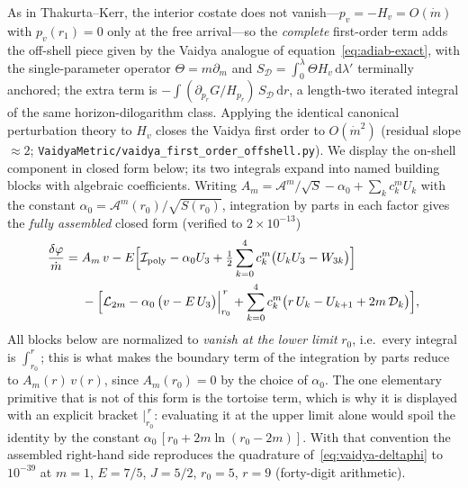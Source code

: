 \documentclass[12pt]{iopart}
\newcommand{\dd}{\mathrm{d}}
\theoremstyle{plain}
\theoremstyle{definition}
\theoremstyle{plain}
\theoremstyle{remark}
\begin{document}
As in Thakurta--Kerr, the interior costate does not
vanish---$p_v=-H_v=O(\dot m)$ with $p_v(r_1)=0$ only at the free arrival---so the
\emph{complete} first-order term adds the off-shell piece given by the Vaidya analogue
of equation~\eqref{eq:adiab-exact}, with the single-parameter operator $\Theta=m\partial_m$
and $S_{\mathcal D}=\int_0^\lambda\Theta H_v\,\dd\lambda'$ terminally anchored; the extra term is
$-\!\int(\partial_{p_r}G/H_{p_r})\,S_{\mathcal D}\,\dd r$, a length-two iterated integral of the
same horizon-dilogarithm class. Applying the identical canonical perturbation theory
to $H_v$ closes the Vaidya first order to $O(\dot m^2)$ (residual slope $\approx2$;
\texttt{VaidyaMetric/vaidya\_first\_order\_offshell.py}). We display the on-shell
component in closed form below;
its two integrals expand into named building blocks with algebraic coefficients.
Writing $A_m=\mathcal{A}^m/\sqrt S-\alpha_0+\sum_k c_k^m U_k$ with the constant
$\alpha_0=\mathcal{A}^m(r_0)/\sqrt{S(r_0)}$, integration by parts in each factor gives
the \emph{fully assembled} closed form (verified to $2\times10^{-13}$)
\begin{equation}
\begin{aligned}
    \frac{\delta\varphi}{\dot m}
    ={}&A_m\,v
    -E\Big[\mathcal{I}_{\rm poly}-\alpha_0 U_3
        +\tfrac12\sum_{k=0}^4 c_k^m\big(U_kU_3-W_{3k}\big)\Big]\\
    &{}-\Big[\mathcal{L}_{2m}-\alpha_0\,\big(v-E\,U_3\big)\Big|_{r_0}^{\,r}
        +\sum_{k=0}^4 c_k^m\big(r\,U_k-U_{k+1}+2m\,\mathcal{D}_k\big)\Big],
\end{aligned}
    \label{eq:vaidya-full}
\end{equation}
All blocks below are normalized to \emph{vanish at the lower limit} $r_0$, i.e.\ every
integral is $\int_{r_0}^{r}$; this is what makes the boundary term of the integration by
parts reduce to $A_m(r)\,v(r)$, since $A_m(r_0)=0$ by the choice of $\alpha_0$. The one
elementary primitive that is not of this form is the tortoise term, which is why it is
displayed with an explicit bracket $\big|_{r_0}^{\,r}$: evaluating it at the upper limit
alone would spoil the identity by the constant
$\alpha_0\,[r_0+2m\ln(r_0-2m)]$. With that convention the assembled
right-hand side reproduces the quadrature of~\eqref{eq:vaidya-deltaphi} to $10^{-39}$ at
$m=1$, $E=7/5$, $J=5/2$, $r_0=5$, $r=9$ (forty-digit arithmetic).
\end{document}
